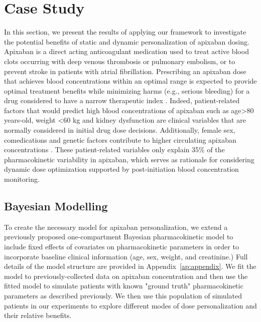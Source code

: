 \section{Case Study}\label{ss:casestudy}

In this section, we present the results of applying our framework to investigate the potential benefits of static and dynamic personalization of apixaban dosing. Apixaban is a direct acting anticoagulant medication used to treat active blood clots occurring with deep venous thrombosis or pulmonary embolism, or to prevent stroke in patients with atrial fibrillation. Prescribing an apixaban dose that achieves blood concentrations within an optimal range is expected to provide optimal treatment benefits while minimizing harms (e.g., serious bleeding) for a drug considered to have a narrow therapeutic index . Indeed, patient-related factors that would predict high blood concentrations of apixaban such as age>80 years-old, weight <60 kg and kidney dysfunction are clinical variables that are normally considered in initial drug dose decisions. Additionally, female sex, comedications and genetic factors contribute to higher circulating apixaban concentrations \cite{gulilat2020drug}. These patient-related variables only explain 35\% of the pharmacokinetic variability in apixaban, which serves as rationale for considering dynamic dose optimization supported by post-initiation blood concentration monitoring. 
\subsection{Bayesian Modelling}

To create the necessary model for apixaban personalization, we extend a previously proposed one-compartment Bayesian pharmacokinetic model \cite{pananos2020comparisons} to include fixed effects of covariates on pharmacokinetic parameters in order to incorporate baseline clinical information (age, sex, weight, and creatinine.)  Full details of the model structure are provided in Appendix~\ref{ap:appendix}. We fit the model to previously-collected data on apixaban concentration \cite{tirona2018apixaban} and then use the fitted model to simulate patients with known "ground truth" pharmacokinetic parameters as described previously. We then use this population of simulated patients in our experiments to explore different modes of dose personalization and their relative benefits.

